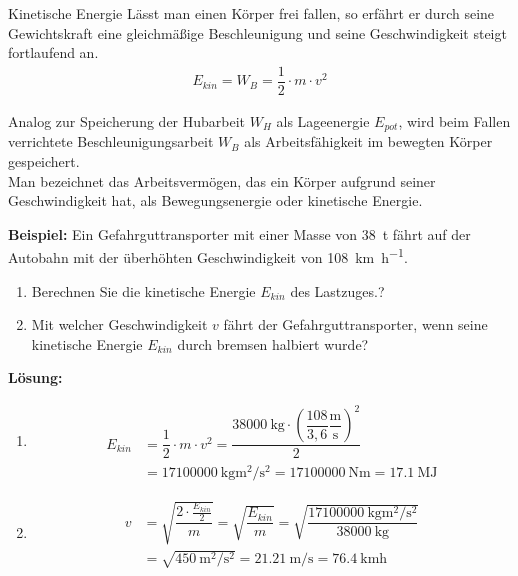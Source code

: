 \documentclass{beamer}
\begin{document}
{  \begin{block}{Kinetische Energie}
Lässt man einen Körper frei fallen, so erfährt er durch seine Gewichtskraft eine gleichmäßige Beschleunigung und seine Geschwindigkeit steigt fortlaufend an.	
	\begin{align}
	E_{kin}=W_B=\dfrac{1}{2}\cdot m\cdot v^{2}
	\end{align}
  \end{block}
  Analog zur Speicherung der Hubarbeit $W_H$ als Lageenergie $E_{pot}$, wird beim Fallen verrichtete Beschleunigungsarbeit $W_B$ als Arbeitsfähigkeit im bewegten Körper gespeichert.\\
  Man bezeichnet das Arbeitsvermögen, das ein Körper aufgrund seiner Geschwindigkeit hat, als Bewegungsenergie oder kinetische Energie.
}
  \textbf{Beispiel:} Ein Gefahrguttransporter mit einer Masse von \SI{38}{\tonne} fährt auf der Autobahn mit der überhöhten Geschwindigkeit von \SI{108}{\kilo\meter\per\hour}.\\
  \begin{enumerate}
  	\item Berechnen Sie die kinetische Energie $E_{kin}$ des Lastzuges.?
  	\item Mit welcher Geschwindigkeit $v$ fährt der Gefahrguttransporter, wenn seine kinetische Energie $E_{kin}$ durch bremsen halbiert wurde?
  \end{enumerate}
  \newpage
  \textbf{Lösung:}
  \begin{enumerate}
  \item
  \begin{align*}
	E_{kin}&=\dfrac{1}{2}\cdot m\cdot v^{2}=\dfrac{\SI{38000}{\kilo\gram}\cdot \left(\dfrac{108}{3,6}\dfrac{\si{\meter}}{\si{\second}}\right)^{2}}{2}\\
	&=\SI{17100000}{\kilo\gram\square\metre\per\square\second}=\SI{17100000}{\newton\meter}=\SI{17,1}{\mega\joule}
  \end{align*}
  \item
    \begin{align*}
	v&=\sqrt{\dfrac{2\cdot \frac{E_{kin}}{2}}{m}}=\sqrt{\dfrac{E_{kin}}{m}}=\sqrt{\dfrac{\SI{17100000}{\kilo\gram\square\metre\per\square\second}}{\SI{38000}{\kilo\gram}}}\\
	&=\sqrt{\SI{450}{\square\meter\per\square\second}}=\SI{21,21}{\meter\per\second}=\SI{76,4}{\kilo\meter\hour}
  \end{align*}
  \end{enumerate}
\end{document}
